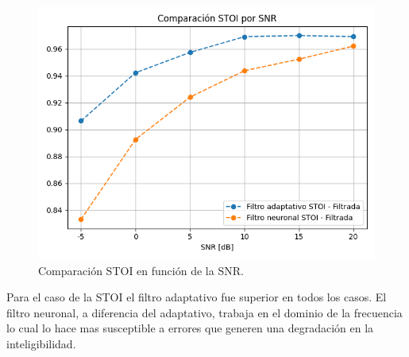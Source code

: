 \begin{figure}[H]
	\centering
	\centerline{\includegraphics[scale=0.75]{images/ch8/comparison_stoi_by_snr.png}}
	\caption{Comparación STOI en función de la SNR.}
	\label{fig:ch8_stoi_comparison_by_snr}
\end{figure}

Para el caso de la STOI el filtro adaptativo fue superior en todos los casos. El filtro neuronal, a diferencia del adaptativo, trabaja en el dominio de la frecuencia lo cual lo hace mas susceptible a errores que generen una degradación en la inteligibilidad.